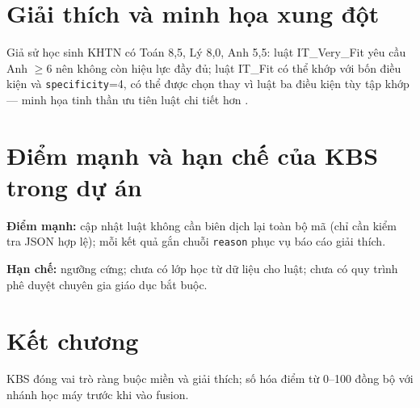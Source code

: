 \section{Giải thích và minh họa xung đột}
Giả sử học sinh KHTN có Toán 8{,}5, Lý 8{,}0, Anh 5{,}5: luật IT\_Very\_Fit yêu cầu Anh $\geq 6$ nên không còn hiệu lực đầy đủ; luật IT\_Fit có thể khớp với bốn điều kiện và \texttt{specificity}=4, có thể được chọn thay vì luật ba điều kiện tùy tập khớp --- minh họa tinh thần ưu tiên luật chi tiết hơn \cite{docs_rules}.

\section{Điểm mạnh và hạn chế của KBS trong dự án}
\textbf{Điểm mạnh:} cập nhật luật không cần biên dịch lại toàn bộ mã (chỉ cần kiểm tra JSON hợp lệ); mỗi kết quả gắn chuỗi \texttt{reason} phục vụ báo cáo giải thích.

\textbf{Hạn chế:} ngưỡng cứng; chưa có lớp học từ dữ liệu cho luật; chưa có quy trình phê duyệt chuyên gia giáo dục bắt buộc.

\section{Kết chương}
KBS đóng vai trò ràng buộc miền và giải thích; số hóa điểm từ 0--100 đồng bộ với nhánh học máy trước khi vào fusion.

